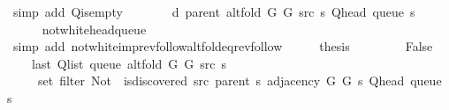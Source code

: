 \begin{isabellebody}
\ {\isacharparenleft}{\kern0pt}simp\ add{\isacharcolon}{\kern0pt}\ Q{\isachardot}{\kern0pt}is{\isacharunderscore}{\kern0pt}empty{\isacharparenright}{\kern0pt}\isanewline
\ \ \isamarkupfalse%
\ \isamarkupfalse%
\ {\isachardoublequoteopen}{\isachardot}{\kern0pt}{\isachardot}{\kern0pt}{\isachardot}{\kern0pt}\ {\isacharequal}{\kern0pt}\ d\ {\isacharparenleft}{\kern0pt}parent\ {\isacharparenleft}{\kern0pt}alt{\isacharunderscore}{\kern0pt}fold\ G{}\ G{}\ src\ s{\isacharparenright}{\kern0pt}{\isacharparenright}{\kern0pt}\ {\isacharparenleft}{\kern0pt}Q{\isacharunderscore}{\kern0pt}head\ {\isacharparenleft}{\kern0pt}queue\ s{\isacharparenright}{\kern0pt}{\isacharparenright}{\kern0pt}\ {\isacharplus}{\kern0pt}\ {}{\isachardoublequoteclose}\isanewline
\ \ \ \ \isamarkupfalse%
\ not{\isacharunderscore}{\kern0pt}white{\isacharunderscore}{\kern0pt}head{\isacharunderscore}{\kern0pt}queue\isanewline
\ \ \ \ \isamarkupfalse%
\ {\isacharparenleft}{\kern0pt}simp\ add{\isacharcolon}{\kern0pt}\ not{\isacharunderscore}{\kern0pt}white{\isacharunderscore}{\kern0pt}imp{\isacharunderscore}{\kern0pt}rev{\isacharunderscore}{\kern0pt}follow{\isacharunderscore}{\kern0pt}alt{\isacharunderscore}{\kern0pt}fold{\isacharunderscore}{\kern0pt}eq{\isacharunderscore}{\kern0pt}rev{\isacharunderscore}{\kern0pt}follow{\isacharparenright}{\kern0pt}\isanewline
\ \ \isamarkupfalse%
\ \isamarkupfalse%
\ {\isacharquery}{\kern0pt}thesis\isanewline
\ \ \ \ \isacommand{{\isachardot}{\kern0pt}}\isamarkupfalse%
\isanewline
{}\isamarkupfalse%
\isanewline
\ \ \isamarkupfalse%
\ False\isanewline
\ \ \isamarkupfalse%
\isanewline
\ \ \ \ {\isachardoublequoteopen}last\ {\isacharparenleft}{\kern0pt}Q{\isacharunderscore}{\kern0pt}list\ {\isacharparenleft}{\kern0pt}queue\ {\isacharparenleft}{\kern0pt}alt{\isacharunderscore}{\kern0pt}fold\ G{}\ G{}\ src\ s{\isacharparenright}{\kern0pt}{\isacharparenright}{\kern0pt}{\isacharparenright}{\kern0pt}\ {\isasymin}\isanewline
\ \ \ \ \ set\ {\isacharparenleft}{\kern0pt}filter\ {\isacharparenleft}{\kern0pt}Not\ {\isasymcirc}\ is{\isacharunderscore}{\kern0pt}discovered\ src\ {\isacharparenleft}{\kern0pt}parent\ s{\isacharparenright}{\kern0pt}{\isacharparenright}{\kern0pt}\ {\isacharparenleft}{\kern0pt}adjacency\ G{}\ G{}\ s\ {\isacharparenleft}{\kern0pt}Q{\isacharunderscore}{\kern0pt}head\ {\isacharparenleft}{\kern0pt}queue\ s{\isacharparenright}{\kern0pt}{\isacharparenright}{\kern0pt}{\isacharparenright}{\kern0pt}{\isacharparenright}{\kern0pt}{\isachardoublequoteclose}\isanewline

\end{isabellebody}
